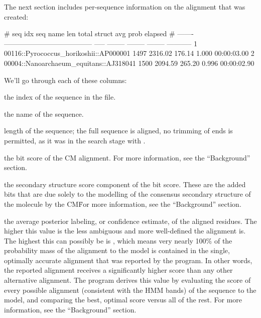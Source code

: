 The next section includes per-sequence information on the alignment
that was created:

\begin{sreoutputtiny}
# seq idx  seq name                                  len     total    struct  avg prob      elapsed
# -------  --------------------------------------  -----  --------  --------  --------  -----------
        1  00116::Pyrococcus_horikoshii::AP000001   1497   2316.02    176.14     1.000  00:00:03.00
        2  00004::Nanoarchaeum_equitans::AJ318041   1500   2094.59    265.20     0.996  00:00:02.90
\end{sreoutputtiny}

We'll go through each of these columns:


\begin{wideitem}
\item[\emprog{seq idx}] the index of the sequence in the file.

\item[\emprog{seq name}] the name of the sequence.

\item[\emprog{len}] length of the sequence; the full sequence is
  aligned, no trimming of ends is permitted, as it was in the search
  stage with .

\item[\emprog{total}] the bit score of the CM alignment. For more
  information, see the ``Background'' section.

\item[\emprog{struct}] the secondary structure score component of the
   bit score. These are the added bits that are due solely
  to the modelling of the consensus secondary structure of the
  molecule by the CM\. For more information, see the ``Background'' section.

\item[\emprog{avg prob}] the average posterior labeling, or confidence
  estimate, of the aligned residues. The higher this value is the less
  ambiguous and more well-defined the alignment is. The highest this
  can possibly be is , which means very nearly 100\% of
  the probability mass of the alignment to the model is contained in
  the single, optimally accurate alignment that was reported by the
  program. In other words, the reported alignment receives a
  significantly higher score than any other alternative alignment. The
  program derives this value by evaluating the score of every possible
  alignment (consistent with the HMM bands) of the sequence to the
  model, and comparing the best, optimal score versus all of the
  rest. For more information, see the ``Background'' section.


\end{wideitem}
